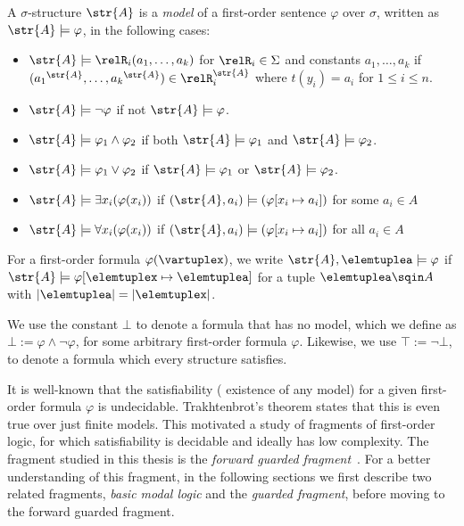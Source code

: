 \begin{definition}
  A $\sigma$-structure $\str{A}$ is a \emph{model} of a first-order sentence $\varphi$ over $\sigma$, written as $\str{A} \models \varphi$, in the following cases:
\begin{itemize}
  \item $\str{A} \models \relR_{i}(a_{1}, \ldots, a_{k})$ for $\relR_{i} \in \Sigma$ and constants $a_{1}, \ldots, a_{k}$ if $({a_{1}}^{\str{A}}, \ldots, {a_{k}}^{\str{A}}) \in \relR_{i}^{\str{A}}$ where $t(y_{i}) = a_{i}$ for $1 \le i \le n$.
  \item $\str{A} \models \neg \varphi$ if not $\str{A} \models \varphi$.
  \item $\str{A} \models \varphi_{1} \land \varphi_{2}$ if both $\str{A} \models \varphi_{1}$ and $\str{A} \models \varphi_{2}$.
  \item $\str{A} \models \varphi_{1} \lor \varphi_{2}$ if $\str{A} \models \varphi_{1}$ or $\str{A} \models \varphi_{2}$.
  \item $\str{A} \models \exists{x_{i}} (\varphi(x_{i}))$ if $(\str{A}, a_{i}) \models (\varphi[x_{i} \mapsto a_{i}])$ for some $a_{i} \in A$
  \item $\str{A} \models \forall{x_{i}} (\varphi(x_{i}))$ if $(\str{A}, a_{i}) \models (\varphi[x_{i} \mapsto a_{i}])$ for all $a_{i} \in A$
\end{itemize}
For a first-order formula $\varphi(\vartuplex)$, we write $\str{A}, \elemtuplea \models \varphi$ if $\str{A} \models \varphi[\elemtuplex \mapsto \elemtuplea]$ for a tuple $\elemtuplea \sqin A$ with $|\elemtuplea| = |\elemtuplex|$.
\end{definition}
We use the constant $\bot$ to denote a formula that has no model, which we define as $\bot := \varphi \land \neg \varphi$, for some arbitrary first-order formula $\varphi$.
Likewise, we use $\top := \neg \bot$, to denote a formula which every structure satisfies.

\begin{figure}
  \centering
  \label{fig:struct-1}
\end{figure}

It is well-known that the satisfiability (\ie{} existence of any model) for a given first-order formula $\varphi$ is undecidable\cite[Sec. 1.1]{borger1997}.
Trakhtenbrot's theorem states that this is even true over just finite models\cite{trakhtenbrot50}.
This motivated a study of fragments of first-order logic, for which satisfiability is decidable and ideally has low complexity.
The fragment studied in this thesis is the \emph{forward guarded fragment}~\cite[Sec. 3.1]{Bednarczyk21}.
For a better understanding of this fragment, in the following sections we first describe two related fragments, \emph{basic modal logic} and the \emph{guarded fragment}, before moving to the forward guarded fragment.

